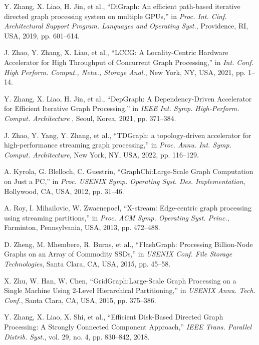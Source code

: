 \documentclass[lettersize,journal]{IEEEtran} %
\begin{document}
\begin{thebibliography}{100}
  Y. Zhang, X. Liao, H. Jin, et al., ``DiGraph: An efficient path-based iterative directed graph processing system on multiple GPUs,'' in \textit{Proc. Int. Cinf. Architectural Support Program. Languages and Operating Syst.}, Providence, RI, USA, 2019, pp. 601--614.
  
  J. Zhao, Y. Zhang, X. Liao, et al., ``LCCG: A Locality-Centric Hardware Accelerator for High Throughput of Concurrent Graph Processing,'' in \textit{Int. Conf. High Perform. Comput., Netw., Storage Anal.}, New York, NY, USA, 2021, pp. 1--14.
  
  Y. Zhang, X. Liao, H. Jin, et al., ``DepGraph: A Dependency-Driven Accelerator for Efficient Iterative Graph Processing,'' in \textit{IEEE Int. Symp. High-Perform. Comput. Architecture }, Seoul, Korea, 2021, pp. 371--384.
  
  J. Zhao, Y. Yang, Y. Zhang, et al., ``TDGraph: a topology-driven accelerator for high-performance streaming graph processing,'' in \textit{Proc. Annu. Int. Symp. Comput. Architecture}, New York, NY, USA, 2022, pp. 116--129.
  
  A. Kyrola, G. Blelloch, C. Guestrin, ``{GraphChi}:{Large-Scale} Graph Computation on Just a {PC},'' in \textit{Proc. USENIX Symp. Operating Syst. Des. Implementation}, Hollywood, CA, USA, 2012, pp. 31--46.
  
  A. Roy, I. Mihailovic, W. Zwaenepoel,  ``X-stream: Edge-centric graph processing using streaming partitions,'' in \textit{Proc. ACM Symp. Operating Syst. Princ.}, Farminton, Pennsylvania, USA, 2013, pp. 472--488.
  
  D. Zheng, M. Mhembere, R. Burns, et al., ``{FlashGraph}: Processing {Billion-Node} Graphs on an Array of Commodity {SSDs},'' in \textit{USENIX Conf. File Storage Technologies}, Santa Clara, CA, USA, 2015, pp. 45--58.
  
  X. Zhu, W. Han, W. Chen, ``{GridGraph}:{Large-Scale} Graph Processing on a Single Machine Using 2-Level Hierarchical Partitioning,'' in \textit{USENIX Annu. Tech. Conf.}, Santa Clara, CA, USA, 2015, pp. 375--386.
  
  Y. Zhang, X. Liao, X. Shi, et al., ``Efficient Disk-Based Directed Graph Processing: A Strongly Connected Component Approach,'' \textit{IEEE Trans. Parallel Distrib. Syst.}, vol. 29, no. 4, pp. 830--842, 2018.
  

\end{thebibliography}
\end{document}
